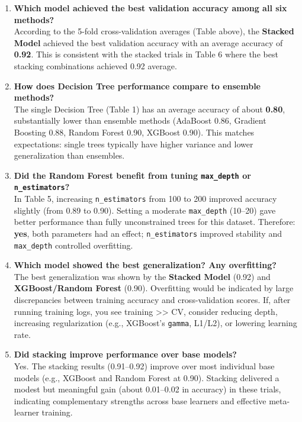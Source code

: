 \documentclass[11pt]{article}
\begin{document}
\begin{enumerate}
    \item \textbf{Which model achieved the best validation accuracy among all six methods?}\\
    According to the 5-fold cross-validation averages (Table above), the \textbf{Stacked Model} achieved the best validation accuracy with an average accuracy of \textbf{0.92}. This is consistent with the stacked trials in Table 6 where the best stacking combinations achieved 0.92 average.
    
    \item \textbf{How does Decision Tree performance compare to ensemble methods?}\\
    The single Decision Tree (Table 1) has an average accuracy of about \textbf{0.80}, substantially lower than ensemble methods (AdaBoost 0.86, Gradient Boosting 0.88, Random Forest 0.90, XGBoost 0.90). This matches expectations: single trees typically have higher variance and lower generalization than ensembles.
    
    \item \textbf{Did the Random Forest benefit from tuning \texttt{max\_depth} or \texttt{n\_estimators}?}\\
    In Table 5, increasing \texttt{n\_estimators} from 100 to 200 improved accuracy slightly (from 0.89 to 0.90). Setting a moderate \texttt{max\_depth} (10--20) gave better performance than fully unconstrained trees for this dataset. Therefore: \textbf{yes}, both parameters had an effect; \texttt{n\_estimators} improved stability and \texttt{max\_depth} controlled overfitting.
    
    \item \textbf{Which model showed the best generalization? Any overfitting?}\\
    The best generalization was shown by the \textbf{Stacked Model} (0.92) and \textbf{XGBoost/Random Forest} (0.90). Overfitting would be indicated by large discrepancies between training accuracy and cross-validation scores. If, after running training logs, you see training >> CV, consider reducing depth, increasing regularization (e.g., XGBoost's \texttt{gamma}, L1/L2), or lowering learning rate.
    
    \item \textbf{Did stacking improve performance over base models?}\\
    Yes. The stacking results (0.91--0.92) improve over most individual base models (e.g., XGBoost and Random Forest at 0.90). Stacking delivered a modest but meaningful gain (about 0.01--0.02 in accuracy) in these trials, indicating complementary strengths across base learners and effective meta-learner training.
\end{enumerate}
\end{document}

